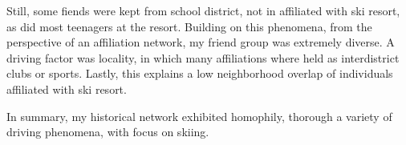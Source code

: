 \documentclass[12pt]{article}
\begin{document}
Still, some fiends were kept from school district, not in affiliated with ski resort, as did most teenagers at the resort.
Building on this phenomena, from the perspective of an affiliation network, my friend group was extremely diverse.
A driving factor was locality, in which many affiliations where held as interdistrict clubs or sports.
Lastly, this explains a low neighborhood overlap of individuals affiliated with ski resort.

In summary, my historical network exhibited homophily, thorough a variety of driving phenomena, with focus on skiing.
\end{document}

